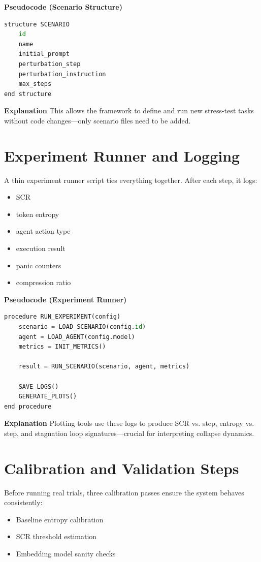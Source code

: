 \documentclass[12pt,a4paper]{report}
\begin{document}
\textbf{Pseudocode (Scenario Structure)}
\begin{lstlisting}[language=Python, caption=Scenario Schema]
structure SCENARIO
    id
    name
    initial_prompt
    perturbation_step
    perturbation_instruction
    max_steps
end structure
\end{lstlisting}

\textbf{Explanation}
This allows the framework to define and run new stress-test tasks without code changes—only scenario files need to be added.

\section{Experiment Runner and Logging}
A thin experiment runner script ties everything together. After each step, it logs:
\begin{itemize}
    \item SCR
    \item token entropy
    \item agent action type
    \item execution result
    \item panic counters
    \item compression ratio
\end{itemize}

\textbf{Pseudocode (Experiment Runner)}
\begin{lstlisting}[language=Python, caption=Experiment Runner]
procedure RUN_EXPERIMENT(config)
    scenario = LOAD_SCENARIO(config.id)
    agent = LOAD_AGENT(config.model)
    metrics = INIT_METRICS()

    result = RUN_SCENARIO(scenario, agent, metrics)

    SAVE_LOGS()
    GENERATE_PLOTS()
end procedure
\end{lstlisting}

\textbf{Explanation}
Plotting tools use these logs to produce SCR vs. step, entropy vs. step, and stagnation loop signatures—crucial for interpreting collapse dynamics.

\section{Calibration and Validation Steps}
Before running real trials, three calibration passes ensure the system behaves consistently:
\begin{itemize}
    \item Baseline entropy calibration
    \item SCR threshold estimation
    \item Embedding model sanity checks
\end{itemize}
\end{document}
